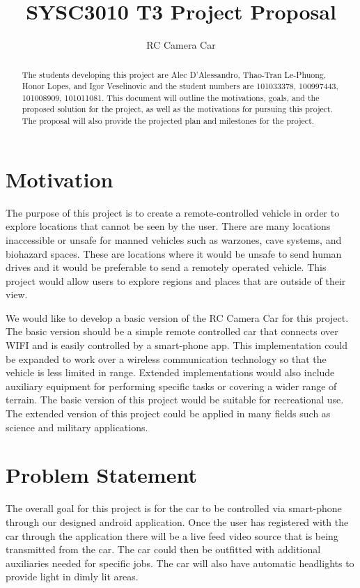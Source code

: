 \documentclass[letterpaper,12pt]{report}
\begin{document}
	\title{SYSC3010 T3 Project Proposal}
	\author{RC Camera Car}
	\date{}
	\maketitle

	\begin{abstract}
		The students developing this project are Alec D'Alessandro, Thao-Tran
		Le-Phuong, Honor Lopes, and Igor Veselinovic and the student numbers are
		101033378, 100997443, 101008909, 101011081. This document will outline
		the motivations, goals, and the proposed solution for the project, as
		well as the motivations for pursuing this project. The proposal will
		also provide the projected plan and milestones for the project.
	\end{abstract}

	\tableofcontents

	\pagebreak

	\section*{Motivation}
	\markright{}
	The purpose of this project is to create a remote-controlled vehicle in 
	order to explore locations that cannot be seen by the user. There are many
	locations inaccessible or unsafe for manned vehicles such as warzones, cave
	systems, and biohazard spaces. These are locations where it would be unsafe
	to send human drives and it would be preferable to send a remotely operated
	vehicle. This project would allow users to explore regions and places that
	are outside of their view.

	We would like to develop a basic version of the RC Camera Car for this
	project. The basic version should be a simple remote 	controlled car that
	connects over WIFI and is easily controlled by a smart-phone app. This
	implementation could be expanded to work over a wireless communication
	technology so that the vehicle is less limited in range. Extended
	implementations would also include auxiliary equipment for performing 
	specific tasks or covering a wider range of terrain. The basic version of 
	this project would be suitable for recreational use. The extended version of
	this project could be applied in many fields such as science and military 
	applications.


	\section*{Problem Statement}
	\markright{}
	The overall goal for this project is for the car to be controlled via
	smart-phone through our designed android application. Once the user has
	registered with the car through the application there will be a live feed
	video source that is being transmitted from the car. The car could then be
	outfitted with additional auxiliaries needed for specific jobs. The car will
	also have automatic headlights to provide light in dimly lit areas.
\end{document}
